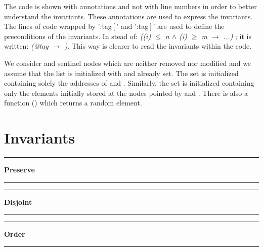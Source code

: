 The code is shown with annotations and not with line numbers in order to better understand the invariants.
%
These annotations are used to express the invariants. 
%
The lines of code wrapped by ':tag$\left[\right.$\;'  and ':tag$\left.\right]$\;' are used to define the preconditions of the invariants. 
%
In stead of: \textit{(\pc(i) $\leq$ n $\wedge$ \pc(i) $\geq$ m  $\to$ ...)} ; it is written: \textit{(@tag $\to$ )}.
%
This way is clearer to read the invariants within the code.


We consider \head and \tail sentinel nodes which are neither removed nor 
modified and we assume that the list is initialized with \head and \tail 
already set.
%
The set \region is initialized containing solely the addresses of \head 
and \tail.
%
Similarly, the set \elements is initialized containing only the elements 
initially stored at the nodes pointed by \head and \tail.
%
There is also a function () which returns a random element. 



\chapter{Invariants}


\label{appendix::inv:full}



\begin{center}\rule{4cm}{0.4pt}  \textbf{Preserve}  \rule{4cm}{0.4pt}\end{center}
\label{inv::full:preserve}
\small{}

\normalsize{}


\begin{center}\rule{4cm}{0.4pt}  \textbf{Disjoint}  \rule{4cm}{0.4pt}\end{center}
\label{inv::full:disjoint}
\small{}

\normalsize{}


\begin{center}\rule{4cm}{0.4pt}  \textbf{Order}  \rule{4cm}{0.4pt}\end{center}
\label{inv::full:order}
\small{}

\normalsize{}


